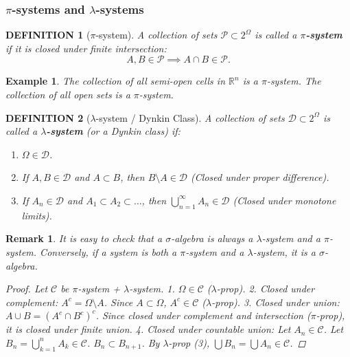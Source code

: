 \documentclass[12pt]{article}
\theoremstyle{blueplain}
\theoremstyle{bluedef}
\newtheorem{definition}{DEFINITION}[section]
\theoremstyle{blueremark}
\newtheorem{remark}{Remark}[section]
\newtheorem{example}{Example}[section]
\newcommand{\R}{\mathbb{R}}
\numberwithin{equation}{section}
\begin{document}
\subsubsection{$\pi$-systems and $\lambda$-systems}

\begin{definition}[$\pi$-system]
  A collection of sets $\mathcal{P} \subset 2^\Omega$ is called a \textbf{$\pi$-system} if it is closed under finite intersection:
  \[ A, B \in \mathcal{P} \implies A \cap B \in \mathcal{P}. \]
\end{definition}

\begin{example}
  The collection of all semi-open cells in $\R^n$ is a $\pi$-system.
  The collection of all open sets is a $\pi$-system.
\end{example}

\begin{definition}[$\lambda$-system / Dynkin Class]
  A collection of sets $\mathcal{D} \subset 2^\Omega$ is called a \textbf{$\lambda$-system} (or a Dynkin class) if:
  \begin{enumerate}
    \item $\Omega \in \mathcal{D}$.
    \item If $A, B \in \mathcal{D}$ and $A \subset B$, then $B \setminus A \in \mathcal{D}$ (Closed under proper difference).
    \item If $A_n \in \mathcal{D}$ and $A_1 \subset A_2 \subset \dots$, then $\bigcup_{n=1}^\infty A_n \in \mathcal{D}$ (Closed under monotone limits).
  \end{enumerate}
\end{definition}

\begin{remark}
  It is easy to check that a $\sigma$-algebra is always a $\lambda$-system and a $\pi$-system.
  Conversely, if a system is both a $\pi$-system and a $\lambda$-system, it is a $\sigma$-algebra.
  \begin{proof}
    Let $\mathcal{C}$ be $\pi$-system + $\lambda$-system.
    1. $\Omega \in \mathcal{C}$ ($\lambda$-prop).
    2. Closed under complement: $A^c = \Omega \setminus A$. Since $A \subset \Omega$, $A^c \in \mathcal{C}$ ($\lambda$-prop).
    3. Closed under union: $A \cup B = (A^c \cap B^c)^c$. Since closed under complement and intersection ($\pi$-prop), it is closed under finite union.
    4. Closed under countable union: Let $A_n \in \mathcal{C}$. Let $B_n = \bigcup_{k=1}^n A_k \in \mathcal{C}$. $B_n \subset B_{n+1}$. By $\lambda$-prop (3), $\bigcup B_n = \bigcup A_n \in \mathcal{C}$.
  \end{proof}
\end{remark}
\end{document}
